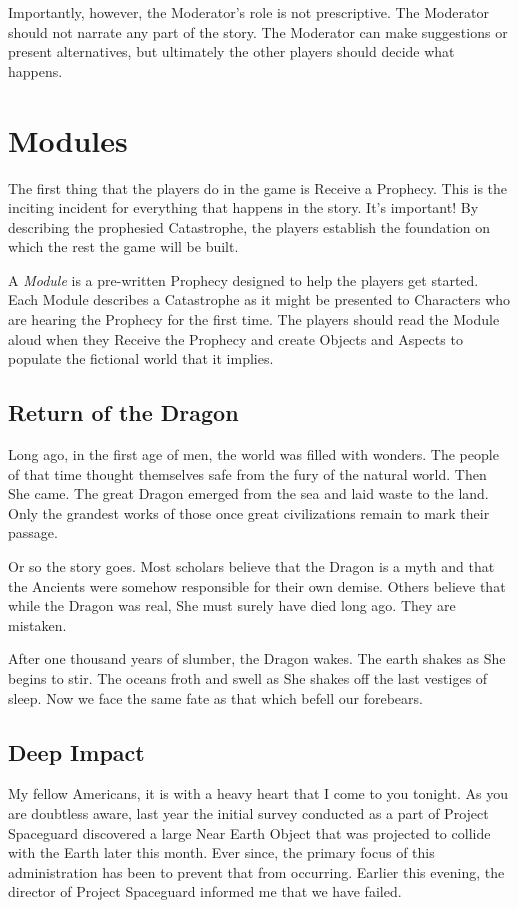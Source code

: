 \documentclass[12pt, a5paper, parskip=half-]{scrartcl}
\begin{document}
Importantly, however, the Moderator's role is not prescriptive.  The Moderator should not narrate any part of the story. The Moderator can make suggestions or present alternatives, but ultimately the other players should decide what happens.

\newpage

\section*{Modules}
The first thing that the players do in the game is Receive a Prophecy.  
This is the inciting incident for everything that happens in the story.
It's important!
By describing the prophesied Catastrophe, the players establish the foundation on which the rest the game will be built.

A \emph{Module} is a pre-written Prophecy designed  to help the players get started.
Each Module describes a Catastrophe as it might be presented to Characters who are hearing the Prophecy for the first time.  The players should read the Module aloud when they Receive the Prophecy and create Objects and Aspects to populate the fictional world that it implies.

\subsection*{Return of the Dragon}
Long ago, in the first age of men, the world was filled with wonders. 
The people of that time thought themselves safe from the fury of the natural world.
Then She came.
The great Dragon emerged from the sea and laid waste to the land.
Only the grandest works of those once great civilizations remain to mark their passage.

Or so the story goes.
Most scholars believe that the Dragon is a myth and that the Ancients were somehow responsible for their own demise.
Others believe that while the Dragon was real, She must surely have died long ago.
They are mistaken. 

After one thousand years of slumber, the Dragon wakes. 
The earth shakes as She begins to stir.
The oceans froth and swell as She shakes off the last vestiges of sleep.
Now we face the same fate as that which befell our forebears.

\newpage

\subsection*{Deep Impact}
My fellow Americans, it is with a heavy heart that I come to you tonight. 
As you are doubtless aware, last year the initial survey conducted as a part of Project Spaceguard discovered a large Near Earth Object that was projected to collide with the Earth later this month.
Ever since, the primary focus of this administration has been to prevent that from occurring. Earlier this evening, the director of Project Spaceguard informed me that we have failed.
\end{document}
